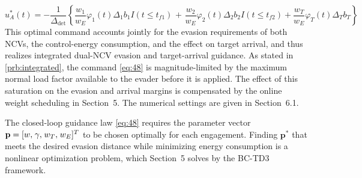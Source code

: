 \begin{equation}
\label{eq:48}
u_A^*(t) =  - \frac{1}{{{\Delta _{\text{det}}}}}\left\{ {\frac{{{w_1}}}{{{w_E}}}{\varphi _1}(t){\Delta _1}{b_1}I(t \leqslant {t_{f1}})} \right.{\text{ + }}\left. {\frac{{{w_2}}}{{{w_E}}}{\varphi _2}(t){\Delta _2}{b_2}I(t \leqslant {t_{f2}}) + \frac{{{w_T}}}{{{w_E}}}{\varphi _T}(t){\Delta _T}{b_T}} \right\}
\end{equation}
This optimal command accounts jointly for the evasion requirements of both NCVs, the control-energy consumption, and the effect on target arrival, and thus realizes integrated dual-NCV evasion and target-arrival guidance. As stated in \cref{prb:integrated}, the command \eqref{eq:48} is magnitude-limited by the maximum normal load factor available to the evader before it is applied. The effect of this saturation on the evasion and arrival margins is compensated by the online weight scheduling in Section~5. The numerical settings are given in Section~6.1.

\begin{problem}
\label{prb:weights}
The closed-loop guidance law \eqref{eq:48} requires the parameter vector ${\mathbf{p}} = {[w,{\kern 1pt} \gamma ,{\kern 1pt} {w_T},{\kern 1pt} {w_E}]^T}$ to be chosen optimally for each engagement. Finding ${{\mathbf{p}}^*}$ that meets the desired evasion distance while minimizing energy consumption is a nonlinear optimization problem, which Section~5 solves by the BC-TD3 framework.
\end{problem}
